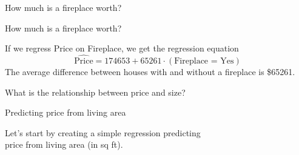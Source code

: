 \documentclass{beamer}\usepackage[]{graphicx}\usepackage[]{color}
\makeatletter
\newcommand{\hlnum}[1]{\textcolor[rgb]{0.824,0.412,0.118}{#1}}%
\newcommand{\hlopt}[1]{\textcolor[rgb]{1,0.894,0.769}{#1}}%
\newcommand{\hlstd}[1]{\textcolor[rgb]{1,0.894,0.769}{#1}}%
\newcommand{\hlkwd}[1]{\textcolor[rgb]{1,0.78,0.769}{#1}}%
\newenvironment{kframe}{%
 \def\at@end@of@kframe{}%
 \ifinner\ifhmode%
  \def\at@end@of@kframe{\end{minipage}}%
  \begin{minipage}{\columnwidth}%
 \fi\fi%
 \def\FrameCommand##1{\hskip\@totalleftmargin \hskip-\fboxsep
 \colorbox{shadecolor}{##1}\hskip-\fboxsep
     \hskip-\linewidth \hskip-\@totalleftmargin \hskip\columnwidth}%
 \MakeFramed {\advance\hsize-\width
   \@totalleftmargin\z@ \linewidth\hsize
   \@setminipage}}%
 {\par\unskip\endMakeFramed%
 \at@end@of@kframe}
\newenvironment{knitrout}{}{} %
\makeatother
\begin{document}
\begin{darkframes}
\begin{frame}[fragile]{How much is a fireplace worth?}
\begin{knitrout}
\end{knitrout}
    \end{frame}

    \begin{frame}[fragile]{How much is a fireplace worth?}
      

      If we regress Price on Fireplace, we get the regression equation
      \[
        \widehat{\text{Price}} = 174653 + 65261\cdot(\text{Fireplace = Yes})
      \]
      The average difference between houses with and without a fireplace is \$65261.

    \end{frame}


    \begin{frame}{What is the relationship between price and size?}
\begin{knitrout}


\end{knitrout}
    \end{frame}

    \begin{frame}{Predicting price from living area}
      \begin{center}
        Let's start by creating a simple regression predicting \\
        price from living area (in sq ft).
      \end{center}
    \end{frame}


\end{darkframes}
\end{document}
